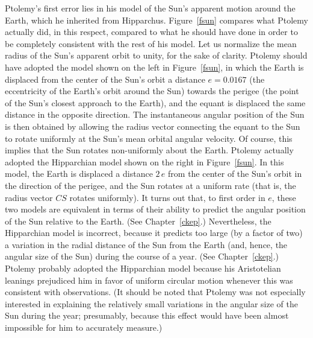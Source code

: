 Ptolemy's first error lies in his model of the Sun's apparent motion around the Earth, which he inherited
from Hipparchus. Figure~\ref{fsun} compares what Ptolemy actually
did, in this respect, compared to
what he should have done in order to be completely consistent
with the rest of his model. Let us normalize the mean radius of the Sun's
apparent orbit  to unity, for the sake of clarity.
 Ptolemy should
have adopted the model shown on the left in Figure~\ref{fsun}, in which the Earth
is displaced from the center of the Sun's orbit a distance $e=0.0167$ (the eccentricity of the Earth's orbit around the Sun) towards the perigee (the point of the Sun's closest approach
to the Earth), and the equant is displaced the same distance in the opposite
direction. The instantaneous angular position of the Sun is then obtained
by allowing the radius vector connecting the equant to the Sun to rotate uniformly at the Sun's mean orbital angular velocity. Of course, this implies that the
Sun rotates non-uniformly about the Earth. Ptolemy actually adopted the Hipparchian model
shown on the right in Figure~\ref{fsun}. In this model, the Earth is displaced
a distance $2\,e$ from  the center of the Sun's orbit in the direction of the perigee,
and the Sun rotates at a uniform rate (that is, the radius vector $CS$ rotates uniformly). It turns out that, to first order in $e$, these two
models are equivalent in terms of their ability to predict the angular position of the Sun relative to the Earth. (See Chapter~\ref{ckep}.) Nevertheless, the Hipparchian
model is incorrect, because it predicts too large (by a factor of two) a variation in  the radial distance of the Sun from the Earth (and, hence,  the angular size of the Sun)  during the
course of a year. (See Chapter~\ref{ckep}.) Ptolemy probably adopted
the Hipparchian model because his Aristotelian leanings prejudiced him in favor of uniform circular motion whenever this was consistent with observations.
(It should be noted that Ptolemy was not  especially interested in explaining the relatively small variations in the angular size of the Sun during the year; presumably, because this effect would 
have been almost impossible for him to accurately measure.)


